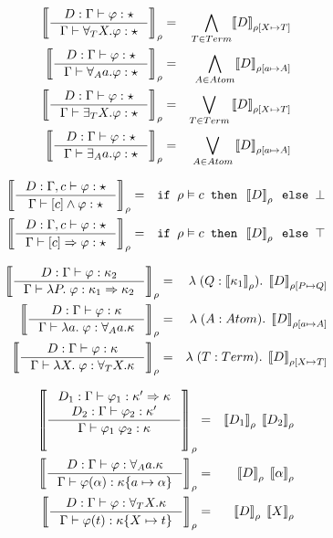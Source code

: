 \documentclass[english, mgr]{iithesis}
\begin{document}
\begin{eqnarray*}
    \interp{
        \inference{D : \types{\formphi}{\kProp}
    }{
        \types{\fForallTerm{\termv}\formphi}{\kProp}}
    } & = & \underset{T \in Term}{\bigwedge} {\interp[{\tmEnv [\termv \mapsto T]}]{D}}  \\
    \interp{
        \inference{D : \types{\formphi}{\kProp}
    }{
        \types{\fForallAtom{\atomv}\formphi}{\kProp}}
    } & = & \underset{A \in Atom}{\bigwedge} {\interp[{\tmEnv [\atomv \mapsto A]}]{D}} \\
    \interp{
        \inference{D : \types{\formphi}{\kProp}
    }{
        \types{\fExistsTerm{\termv} \formphi}{\kProp}}
    } & = & \underset{T \in Term}{\bigvee}\interp[{\tmEnv [\termv \mapsto T]}]{D} \\
    \interp{
        \inference{D : \types{\formphi}{\kProp}
    }{
        \types{\fExistsAtom{\atomv} \formphi}{\kProp}}
    } & = & \underset{A \in Atom}{\bigvee} \interp[{\tmEnv [\atomv \mapsto A]}]{D}
\end{eqnarray*}

\begin{eqnarray*}
   \interp{
        \inference{D : \types[\Gamma, c]{\formphi}{\kProp}
    }{
        \types{[c] \wedge \formphi}{\kProp}}
    } & = &  \texttt{if } \tmEnv \vDash c \texttt{ then } \interp{D} \texttt{ else } \bot
    \\
    \interp{
        \inference{D : \types[\Gamma, c]{\formphi}{\kProp}
    }{
        \types{[c] \Rightarrow \formphi}{\kProp}}
    } & = &  \texttt{if } \tmEnv \vDash c \texttt{ then } \interp{D} \texttt{ else } \top
\end{eqnarray*}

\begin{eqnarray*}
    \interp{\inference{D : \types{\formphi}{\kind_2}}{\types{\lam[\propv]\formphi}{\kind_1\karr\kind_2}}} & = &
    \lambda\;(Q : \interp{\kind_1}).\;\interp[{\tmEnv[\propv\mapsto Q]}]{D}
    \\
    \interp{\inference{D: \types{\formphi}{\kind}}{\types{\lam[\atomv]\formphi}{\kForallAtom{\atomv}\kind}}} & = &
    \lambda\;(A : Atom).\;\interp[{\tmEnv[\atomv\mapsto A]}]{D}
    \\
    \interp{\inference{D: \types{\formphi}{\kind}}{\types{\lam[\termv]\formphi}{\kForallTerm{\termv}\kind}}} & = &
    \lambda\;(T : Term).\;\interp[{\tmEnv[\termv\mapsto T]}]{D}
\end{eqnarray*}

\begin{eqnarray*}
    \interp{\inference{D_1: \types{\formphi_1}{\kind'\karr\kind} \\ D_2: \types{\formphi_2}{\kind'}}{\types{\formphi_1\;\formphi_2}{\kind}}} & = &
    \interp{D_1}\; \interp{D_2}
    \\
    \interp{\inference{D: \types{\formphi}{\kForallAtom{\atomv}\kind}}{\types{\formphi(\atomexp)}{\kind\{\atomv \mapsto \atomexp\}}}} & = &
    \interp{D}\;\interp{\atomexp}
    \\
    \interp{\inference{D: \types{\formphi}{\kForallTerm{\termv}\kind}}{\types{\formphi(\term)}{\kind\{\termv \mapsto \term\}}}} & = &
    \interp{D}\;\interp{\termv}
\end{eqnarray*}
\end{document}
